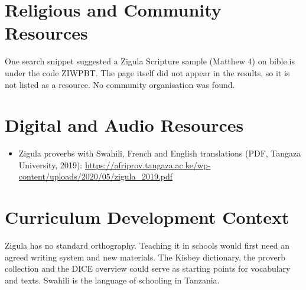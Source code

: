 \documentclass[12pt]{article}
\begin{document}
\section{Religious and Community Resources}
One search snippet suggested a Zigula Scripture sample (Matthew 4) on bible.is under the code ZIWPBT. The page itself did not appear in the results, so it is not listed as a resource. No community organisation was found.

\section{Digital and Audio Resources}
\begin{itemize}
\item Zigula proverbs with Swahili, French and English translations (PDF, Tangaza University, 2019): \url{https://afriprov.tangaza.ac.ke/wp-content/uploads/2020/05/zigula_2019.pdf}
\end{itemize}

\section{Curriculum Development Context}
Zigula has no standard orthography. Teaching it in schools would first need an agreed writing system and new materials. The Kisbey dictionary, the proverb collection and the DICE overview could serve as starting points for vocabulary and texts. Swahili is the language of schooling in Tanzania.
\end{document}
